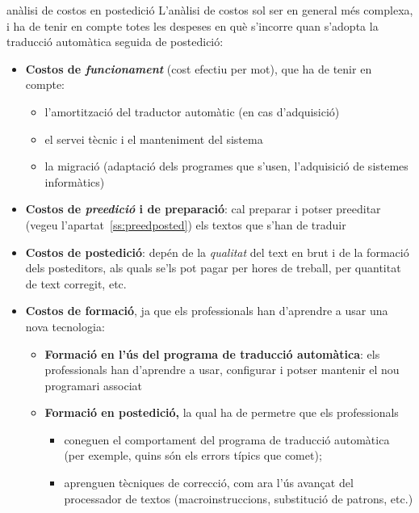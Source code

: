   \begin{persabermes}{anàlisi de costos en postedició}
    L'anàlisi de costos sol ser en general més complexa, i ha de tenir
    en compte totes les despeses en què s'incorre quan s'adopta la
    traducció automàtica seguida de postedició:
    \begin{itemize} 
    \item \textbf{Costos de \emph{funcionament}} (cost efectiu per
      mot), que ha de tenir en compte:
        \begin{itemize} 
        \item l'amortització del traductor automàtic (en cas d'adquisició)
        \item el servei tècnic i el manteniment del sistema
        \item la migració (adaptació dels programes que s'usen,
          l'adquisició de sistemes informàtics) 
        \end{itemize} 

      \item \textbf{Costos de \emph{preedició} i de preparació}: cal
        preparar i potser preeditar (vegeu l'apartat~\ref{ss:preedposted}) els textos que s'han de traduir

      \item \textbf{Costos de postedició}: depén de la \emph{qualitat}
        del text en brut i de la formació dels posteditors, als quals
        se'ls pot pagar per hores de treball, per quantitat de text
        corregit, etc.

      \item \textbf{Costos de formació}, ja que els professionals han
        d'aprendre a usar una nova tecnologia:
        \begin{itemize} 
        \item \textbf{Formació en l'ús del programa de traducció
            automàtica}: els professionals han d'aprendre a usar,
          configurar i potser mantenir el nou programari associat
        \item \textbf{Formació en postedició,} la qual ha de permetre
          que els professionals
          \begin{itemize} 
          \item coneguen el comportament del programa de traducció
            automàtica (per exemple, quins són els errors típics que
            comet);
          \item aprenguen tècniques de correcció, com ara l'ús avançat
            del processador de textos (macroinstruccions, substitució
            de patrons, etc.)
           \end{itemize}
        \end{itemize}
   \end{itemize}
  \end{persabermes}

